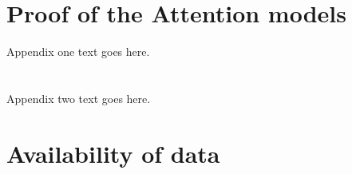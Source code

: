 \documentclass[10pt,journal,compsoc]{IEEEtran}
\begin{document}




%


\appendices
\section{Proof of the Attention models}
Appendix one text goes here.

\section{}
Appendix two text goes here.




\section*{Availability of data}
\end{document}
